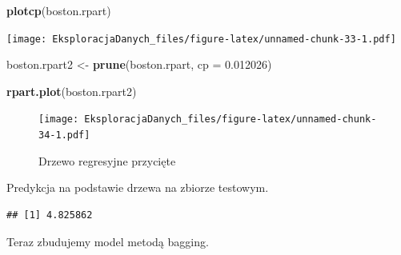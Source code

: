 \documentclass[]{book}
\newenvironment{Shaded}{\begin{snugshade}}{\end{snugshade}}
\newcommand{\ControlFlowTok}[1]{\textcolor[rgb]{0.13,0.29,0.53}{\textbf{#1}}}
\newcommand{\DataTypeTok}[1]{\textcolor[rgb]{0.13,0.29,0.53}{#1}}
\newcommand{\DecValTok}[1]{\textcolor[rgb]{0.00,0.00,0.81}{#1}}
\newcommand{\FloatTok}[1]{\textcolor[rgb]{0.00,0.00,0.81}{#1}}
\newcommand{\KeywordTok}[1]{\textcolor[rgb]{0.13,0.29,0.53}{\textbf{#1}}}
\newcommand{\NormalTok}[1]{#1}
\newcommand{\OperatorTok}[1]{\textcolor[rgb]{0.81,0.36,0.00}{\textbf{#1}}}
\newcommand{\StringTok}[1]{\textcolor[rgb]{0.31,0.60,0.02}{#1}}
\theoremstyle{plain}
\theoremstyle{definition}
\theoremstyle{definition}
\theoremstyle{definition}
\theoremstyle{definition}
\theoremstyle{remark}
\begin{document}
\begin{Shaded}
\begin{Highlighting}[]
\KeywordTok{plotcp}\NormalTok{(boston.rpart)}
\end{Highlighting}
\end{Shaded}

\texttt{[image: EksploracjaDanych\_files/figure-latex/unnamed-chunk-33-1.pdf]}

\begin{Shaded}
\begin{Highlighting}[]
\NormalTok{boston.rpart2 <-}\StringTok{ }\KeywordTok{prune}\NormalTok{(boston.rpart, }\DataTypeTok{cp =} \FloatTok{0.012026}\NormalTok{)}
\end{Highlighting}
\end{Shaded}

\begin{Shaded}
\begin{Highlighting}[]
\KeywordTok{rpart.plot}\NormalTok{(boston.rpart2)}
\end{Highlighting}
\end{Shaded}

\begin{figure}
\centering
\texttt{[image: EksploracjaDanych\_files/figure-latex/unnamed-chunk-34-1.pdf]}
\caption{\label{fig:unnamed-chunk-34}Drzewo regresyjne przycięte}
\end{figure}

Predykcja na podstawie drzewa na zbiorze testowym.

\begin{Shaded}
\end{Shaded}

\begin{verbatim}
## [1] 4.825862
\end{verbatim}

Teraz zbudujemy model metodą bagging.
\end{document}
